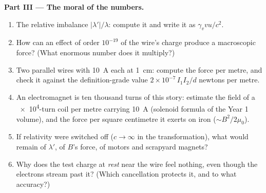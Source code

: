\begin{problem}
\medskip\noindent\textbf{Part III --- The moral of the numbers.}
\begin{enumerate}[resume]
  \item The relative imbalance $|\lambda'|/\lambda$: compute it and
        write it as $\gamma_v vu/c^2$.
  \item How can an effect of order $10^{-19}$ of the wire's charge
        produce a macroscopic force? (What enormous number does it
        multiply?)
  \item Two parallel wires with \qty{10}{A} each at \qty{1}{cm}:
        compute the force per metre, and check it against the
        definition-grade value $2 \times 10^{-7}\,I_1I_2/d$ newtons
        per metre.
  \item An electromagnet is ten thousand turns of this story:
        estimate the field of a \qty{e4}{}-turn coil per metre
        carrying \qty{10}{A} (solenoid formula of the Year 1
        volume), and the force per square centimetre it exerts on
        iron ($\sim B^2/2\mu_0$).
  \item If relativity were switched off ($c \to \infty$ in the
        transformation), what would remain of $\lambda'$, of $B$'s
        force, of motors and scrapyard magnets?
  \item Why does the test charge at \emph{rest} near the wire feel
        nothing, even though the electrons stream past it? (Which
        cancellation protects it, and to what accuracy?)
\end{enumerate}


\end{problem}
